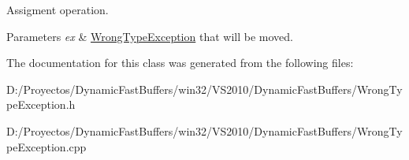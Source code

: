 Assigment operation. 


\begin{DoxyParams}{Parameters}
{\em ex} & \hyperlink{class_dynamic_fast_buffers_1_1_wrong_type_exception}{Wrong\-Type\-Exception} that will be moved. \\
\hline
\end{DoxyParams}


The documentation for this class was generated from the following files\-:\begin{DoxyCompactItemize}
\item 
D\-:/\-Proyectos/\-Dynamic\-Fast\-Buffers/win32/\-V\-S2010/\-Dynamic\-Fast\-Buffers/Wrong\-Type\-Exception.\-h\item 
D\-:/\-Proyectos/\-Dynamic\-Fast\-Buffers/win32/\-V\-S2010/\-Dynamic\-Fast\-Buffers/Wrong\-Type\-Exception.\-cpp\end{DoxyCompactItemize}
